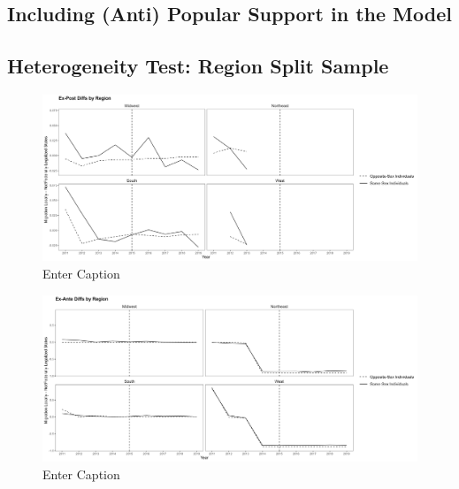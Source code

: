 \documentclass[12pt,letterpaper]{article}
\begin{document}
\begin{landscape}
\begin{scriptsize}


\end{scriptsize}
\end{landscape}

\subsection{Including (Anti) Popular Support in the Model}
\clearpage





\subsection{Heterogeneity Test: Region Split Sample}
\clearpage
\begin{figure}
    \centering
    \includegraphics[width=1\linewidth]{outputs/summary_stats/region_post_diffs.png}
    \caption{Enter Caption}
    \label{fig:enter-label}
\end{figure}

\begin{figure}
    \centering
    \includegraphics[width=1\linewidth]{outputs/summary_stats/region_ante_diffs.png}
    \caption{Enter Caption}
    \label{fig:enter-label}
\end{figure}
\end{document}
